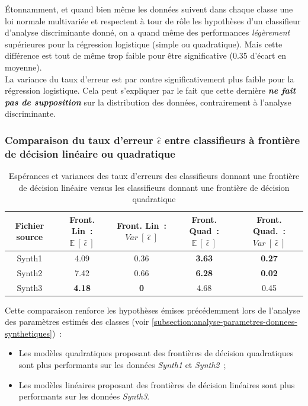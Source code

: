 \documentclass[a4paper,10pt]{report}
\begin{document}
Étonnamment, et quand bien même les données suivent dans chaque classe une loi normale multivariée et respectent à tour de rôle les hypothèses d'un classifieur d'analyse discriminante donné, on a quand même des performances \textit{légèrement} supérieures pour la régression logistique (simple ou quadratique). Mais cette différence est tout de même trop faible pour être significative (0.35 d'écart en moyenne).\\
La variance du taux d'erreur est par contre significativement plus faible pour la régression logistique. Cela peut s'expliquer par le fait que cette dernière \textit{\textbf{ne fait pas de supposition}} sur la distribution des données, contrairement à l'analyse discriminante.

\subsubsection{Comparaison du taux d'erreur $\hat{\epsilon}$ entre classifieurs à frontière de décision linéaire ou quadratique}
\begin{table}[H]
	\centering
	\captionsetup{justification=centering, margin=1cm}
	\begin{tabular}{c|c|c|c|c}
		Fichier source & Front. Lin~: $\mathbb{E}\ [\ \hat{\epsilon}\ ]$ & Front. Lin~: $Var\ [\ \hat{\epsilon}\ ]$ & Front. Quad~: $\mathbb{E}\ [\ \hat{\epsilon}\ ]$ & Front. Quad.~: $Var\ [\ \hat{\epsilon}\ ]$ \\ 
		\hline
		Synth1 & 4.09    & 0.36   & \textbf{3.63}   & \textbf{0.27}   \\ 
		Synth2 & 7.42   & 0.66   &  \textbf{6.28}  & \textbf{0.02}  \\ 
		Synth3 &  \textbf{4.18}  &  \textbf{0}  & 4.68   & 0.45   \\ 
	\end{tabular}
	\caption{\small Espérances et variances des taux d'erreurs des classifieurs donnant une frontière de décision linéaire versus les classifieurs donnant une frontière de décision quadratique}
	\label{table:2-1-erreur-data-synth-mean-var-lin-vs-quad}
\end{table}

Cette comparaison renforce les hypothèses émises précédemment lors de l'analyse des paramètres estimés des classes (voir \autoref{subsection:analyse-parametres-donnees-synthetiques})~:
\begin{itemize}
	\item Les modèles quadratiques proposant des frontières de décision quadratiques sont plus performants sur les données \textit{Synth1} et \textit{Synth2}~;
	\item Les modèles linéaires proposant des frontières de décision linéaires sont plus performants sur les données \textit{Synth3}.
\end{itemize}
\end{document}
